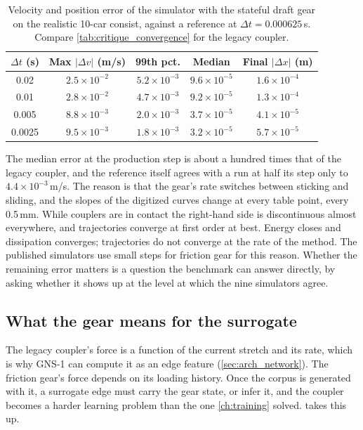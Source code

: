 \begin{table}[htbp]
    \centering
    \begin{tabular}{ccccc}
        \toprule
        $\Delta t$ (s) & Max $|\Delta v|$ (m/s) & 99th pct. & Median & Final $|\Delta x|$ (m) \\
        \midrule
        0.02   & $2.5\times10^{-2}$ & $5.2\times10^{-3}$ & $9.6\times10^{-5}$ & $1.6\times10^{-4}$ \\
        0.01   & $2.8\times10^{-2}$ & $4.7\times10^{-3}$ & $9.2\times10^{-5}$ & $1.3\times10^{-4}$ \\
        0.005  & $8.8\times10^{-3}$ & $2.0\times10^{-3}$ & $3.7\times10^{-5}$ & $4.1\times10^{-5}$ \\
        0.0025 & $9.5\times10^{-3}$ & $1.8\times10^{-3}$ & $3.2\times10^{-5}$ & $5.7\times10^{-5}$ \\
        \bottomrule
    \end{tabular}
    \caption{Velocity and position error of the simulator with the stateful draft gear on the realistic 10-car consist, against a reference at $\Delta t = 0.000625$\,s. Compare \cref{tab:critique_convergence} for the legacy coupler.}
    \label{tab:bench_gear_convergence}
\end{table}

The median error at the production step is about a hundred times that of the legacy coupler, and the reference itself agrees with a run at half its step only to $4.4\times10^{-3}$\,m/s. The reason is that the gear's rate switches between sticking and sliding, and the slopes of the digitized curves change at every table point, every 0.5\,mm. While couplers are in contact the right-hand side is discontinuous almost everywhere, and trajectories converge at first order at best. Energy closes and dissipation converges; trajectories do not converge at the rate of the method. The published simulators use small steps for friction gear for this reason. Whether the remaining error matters is a question the benchmark can answer directly, by asking whether it shows up at the level at which the nine simulators agree.

\subsection{What the gear means for the surrogate}

The legacy coupler's force is a function of the current stretch and its rate, which is why GNS-1 can compute it as an edge feature (\cref{sec:arch_network}). The friction gear's force depends on its loading history. Once the corpus is generated with it, a surrogate edge must carry the gear state, or infer it, and the coupler becomes a harder learning problem than the one \cref{ch:training} solved.  takes this up.

